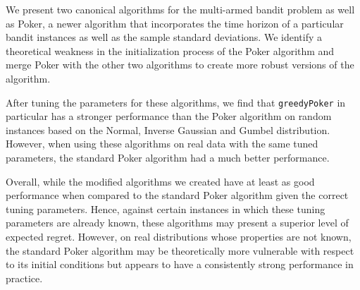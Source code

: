 \documentclass[12pt]{article}
\begin{document}
We present two canonical algorithms for the multi-armed bandit problem as well as Poker, a newer algorithm that incorporates the time horizon of a particular bandit instances as well as the sample standard deviations. We identify a theoretical weakness in the initialization process of the Poker algorithm and merge Poker with the other two algorithms to create more robust versions of the algorithm.

After tuning the parameters for these algorithms, we find that \texttt{greedyPoker} in particular has a stronger performance than the Poker algorithm on random instances based on the Normal, Inverse Gaussian and Gumbel distribution. However, when using these algorithms on real data with the same tuned parameters, the standard Poker algorithm had a much better performance.

Overall, while the modified algorithms we created have at least as good performance when compared to the standard Poker algorithm given the correct tuning parameters. Hence, against certain instances in which these tuning parameters are already known, these algorithms may present a superior level of expected regret. However, on real distributions whose properties are not known, the standard Poker algorithm may be theoretically more vulnerable with respect to its initial conditions but appears to have a consistently strong performance in practice.



\end{document}
